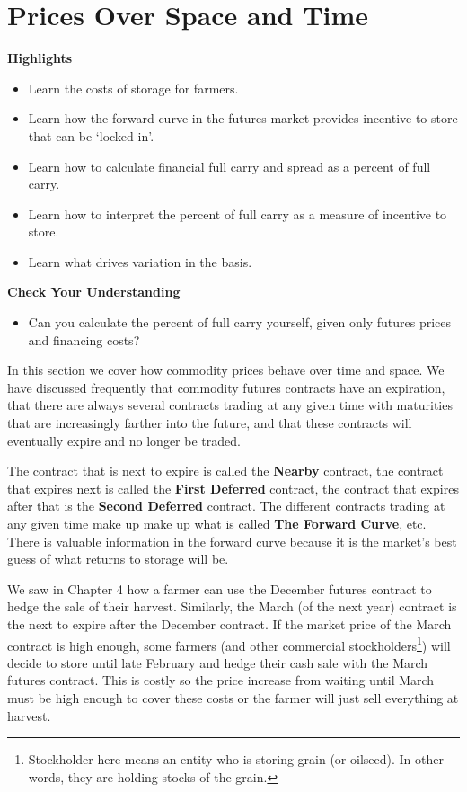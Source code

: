 \documentclass[
]{book}
\providecommand{\tightlist}{%
  \setlength{\itemsep}{0pt}\setlength{\parskip}{0pt}}
\begin{document}
\hypertarget{prices-over-space-and-time}{%
\chapter{Prices Over Space and Time}\label{prices-over-space-and-time}}

\textbf{Highlights}

\begin{itemize}
\tightlist
\item
  Learn the costs of storage for farmers.
\item
  Learn how the forward curve in the futures market provides incentive to store that can be `locked in'.
\item
  Learn how to calculate financial full carry and spread as a percent of full carry.
\item
  Learn how to interpret the percent of full carry as a measure of incentive to store.
\item
  Learn what drives variation in the basis.
\end{itemize}

\textbf{Check Your Understanding}

\begin{itemize}
\tightlist
\item
  Can you calculate the percent of full carry yourself, given only futures prices and financing costs?
\end{itemize}

In this section we cover how commodity prices behave over time and space. We have discussed frequently that commodity futures contracts have an expiration, that there are always several contracts trading at any given time with maturities that are increasingly farther into the future, and that these contracts will eventually expire and no longer be traded.

The contract that is next to expire is called the \textbf{Nearby} contract, the contract that expires next is called the \textbf{First Deferred} contract, the contract that expires after that is the \textbf{Second Deferred} contract. The different contracts trading at any given time make up make up what is called \textbf{The Forward Curve}, etc. There is valuable information in the forward curve because it is the market's best guess of what returns to storage will be.

We saw in Chapter 4 how a farmer can use the December futures contract to hedge the sale of their harvest. Similarly, the March (of the next year) contract is the next to expire after the December contract. If the market price of the March contract is high enough, some farmers (and other commercial stockholders\footnote{Stockholder here means an entity who is storing grain (or oilseed). In other-words, they are holding stocks of the grain.}) will decide to store until late February and hedge their cash sale with the March futures contract. This is costly so the price increase from waiting until March must be high enough to cover these costs or the farmer will just sell everything at harvest.
\end{document}
